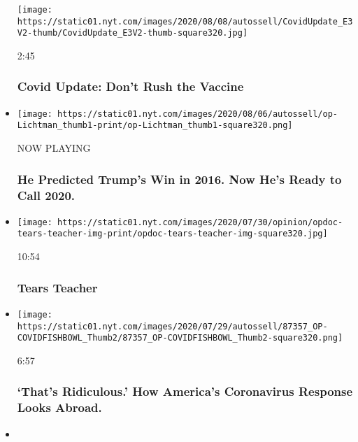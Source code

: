 \begin{itemize}
  \texttt{[image: https://static01.nyt.com/images/2020/08/08/autossell/CovidUpdate\_E3V2-thumb/CovidUpdate\_E3V2-thumb-square320.jpg]}

  2:45

  \hypertarget{covid-update-dont-rush-the-vaccine}{%
  \subsubsection{Covid Update: Don't Rush the
  Vaccine}\label{covid-update-dont-rush-the-vaccine}}
\item
  \texttt{[image: https://static01.nyt.com/images/2020/08/06/autossell/op-Lichtman\_thumb1-print/op-Lichtman\_thumb1-square320.png]}

  NOW PLAYING

  \hypertarget{he-predicted-trumps-win-in-2016-now-hes-ready-to-call-2020-2}{%
  \subsubsection{He Predicted Trump's Win in 2016. Now He's Ready to
  Call
  2020.}\label{he-predicted-trumps-win-in-2016-now-hes-ready-to-call-2020-2}}
\item
  \href{https://www.nytimes.com/video/opinion/100000007247238/tears-teacher.html?action=click\&module=video-series-bar\&region=header\&pgtype=Article\&playlistId=video/opinion}{}

  \texttt{[image: https://static01.nyt.com/images/2020/07/30/opinion/opdoc-tears-teacher-img-print/opdoc-tears-teacher-img-square320.jpg]}

  10:54

  \hypertarget{tears-teacher}{%
  \subsubsection{Tears Teacher}\label{tears-teacher}}
\item
  \href{https://www.nytimes.com/video/opinion/100000007227777/covid-19-global-response.html?action=click\&module=video-series-bar\&region=header\&pgtype=Article\&playlistId=video/opinion}{}

  \texttt{[image: https://static01.nyt.com/images/2020/07/29/autossell/87357\_OP-COVIDFISHBOWL\_Thumb2/87357\_OP-COVIDFISHBOWL\_Thumb2-square320.png]}

  6:57

  \hypertarget{thats-ridiculous-how-americas-coronavirus-response-looks-abroad}{%
  \subsubsection{`That's Ridiculous.' How America's Coronavirus Response
  Looks
  Abroad.}\label{thats-ridiculous-how-americas-coronavirus-response-looks-abroad}}
\item
  \href{https://www.nytimes.com/video/opinion/100000007229285/the-lonely-goalkeeper.html?action=click\&module=video-series-bar\&region=header\&pgtype=Article\&playlistId=video/opinion}{}


\end{itemize}
